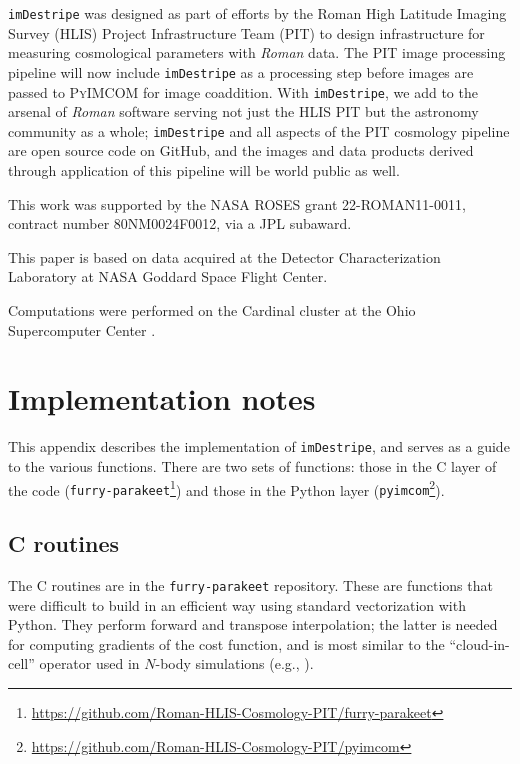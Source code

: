 \documentclass[]{pasj01}
\begin{document}
\texttt{imDestripe} was designed as part of efforts by the Roman High Latitude Imaging Survey (HLIS) Project Infrastructure Team (PIT) to design infrastructure for measuring cosmological parameters with \textit{Roman} data. The PIT image processing pipeline will now include \texttt{imDestripe} as a processing step before images are passed to \textsc{PyIMCOM} for image coaddition. With \texttt{imDestripe}, we add to the arsenal of \textit{Roman} software serving not just the HLIS PIT but the astronomy community as a whole; \texttt{imDestripe} and all aspects of the PIT cosmology pipeline are open source code on GitHub, and the images and data products derived through application of this pipeline will be world public as well. 

\begin{ack}
 This work was supported by the NASA ROSES grant 22-ROMAN11-0011, contract number 80NM0024F0012, via a JPL subaward. 
 
 This paper is based on data acquired at the Detector Characterization Laboratory at NASA Goddard Space Flight Center.

 
Computations were performed on the Cardinal cluster at
the Ohio Supercomputer Center \citep{OSC}.
\end{ack}

\appendix

\section{Implementation notes}
\label{app:codenotes}

This appendix describes the implementation of \texttt{imDestripe}, and serves as a guide to the various functions. There are two sets of functions: those in the C layer of the code ({\tt furry-parakeet}\footnote{\url{https://github.com/Roman-HLIS-Cosmology-PIT/furry-parakeet}}) and those in the Python layer ({\tt pyimcom}\footnote{\url{https://github.com/Roman-HLIS-Cosmology-PIT/pyimcom}}).

\subsection{C routines}

The C routines are in the {\tt furry-parakeet} repository. These are functions that were difficult to build in an efficient way using standard vectorization with Python. They perform forward and transpose interpolation; the latter is needed for computing gradients of the cost function, and is most similar to the ``cloud-in-cell'' operator used in $N$-body simulations (e.g., \cite{Eastwood1974}).
\end{document}
